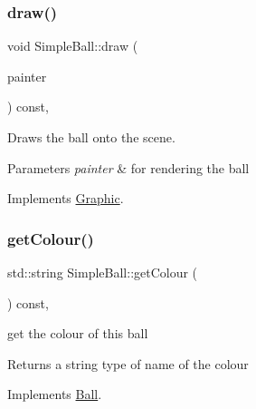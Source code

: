 \subsubsection{\texorpdfstring{draw()}{draw()}}
{\footnotesize\ttfamily void Simple\+Ball\+::draw (\begin{DoxyParamCaption}\item[{Q\+Painter \&}]{painter }\end{DoxyParamCaption}) const\hspace{0.3cm}{\ttfamily [override]}, {\ttfamily [virtual]}}



Draws the ball onto the scene. 


\begin{DoxyParams}{Parameters}
{\em painter} & for rendering the ball \\
\hline
\end{DoxyParams}


Implements \mbox{\hyperlink{class_graphic_aed0af75ae3756baeb3fe663ae5f36f29}{Graphic}}.

\mbox{\label{class_simple_ball_aad4437558814bc8c6f276d5e09507eb4}} 
\subsubsection{\texorpdfstring{get\+Colour()}{getColour()}}
{\footnotesize\ttfamily std\+::string Simple\+Ball\+::get\+Colour (\begin{DoxyParamCaption}{ }\end{DoxyParamCaption}) const\hspace{0.3cm}{\ttfamily [override]}, {\ttfamily [virtual]}}



get the colour of this ball 

\begin{DoxyReturn}{Returns}
a string type of name of the colour 
\end{DoxyReturn}


Implements \mbox{\hyperlink{class_ball_a248c8a5fc9b8770840f275ea7057b012}{Ball}}.

\mbox{\label{class_simple_ball_ac9c7e389cf03bfb2f3e71d66bf6608cd}} 
